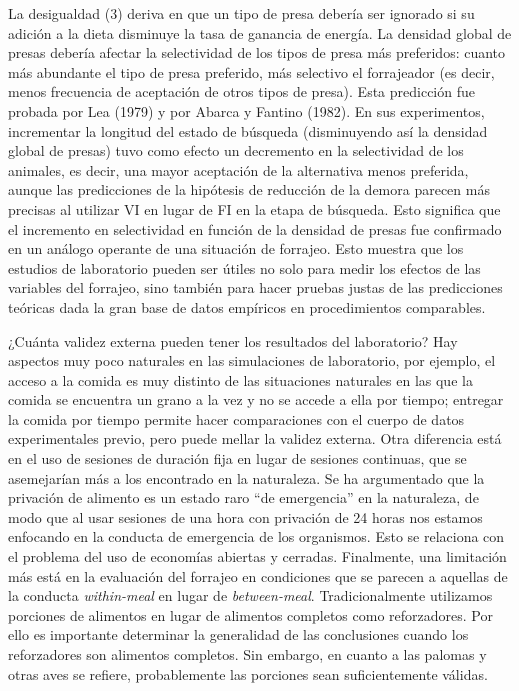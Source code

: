 \documentclass[a4paper,12pt]{article}
\begin{document}
La desigualdad (3) deriva en que un tipo de presa debería ser ignorado si su adición a la dieta disminuye la tasa de ganancia de energía. La densidad global de presas debería afectar la selectividad de los tipos de presa más preferidos: cuanto más abundante el tipo de presa preferido, más selectivo el forrajeador (es decir, menos frecuencia de aceptación de otros tipos de presa). Esta predicción fue probada por Lea (1979) y por Abarca y Fantino (1982). En sus experimentos, incrementar la longitud del estado de búsqueda (disminuyendo así la densidad global de presas) tuvo como efecto un decremento en la selectividad de los animales, es decir, una mayor aceptación de la alternativa menos preferida, aunque las predicciones de la hipótesis de reducción de la demora parecen más precisas al utilizar VI en lugar de FI en la etapa de búsqueda. Esto significa que el incremento en selectividad en función de la densidad de presas fue confirmado en un análogo operante de una situación de forrajeo. Esto muestra que los estudios de laboratorio pueden ser útiles no solo para medir los efectos de las variables del forrajeo, sino también para hacer pruebas justas de las predicciones teóricas dada la gran base de datos empíricos en procedimientos comparables.

¿Cuánta validez externa pueden tener los resultados del laboratorio? Hay aspectos muy poco naturales en las simulaciones de laboratorio, por ejemplo, el acceso a la comida es muy distinto de las situaciones naturales en las que la comida se encuentra un grano a la vez y no se accede a ella por tiempo; entregar la comida por tiempo permite hacer comparaciones con el cuerpo de datos experimentales previo, pero puede mellar la validez externa. Otra diferencia está en el uso de sesiones de duración fija en lugar de sesiones continuas, que se asemejarían más a los encontrado en la naturaleza. Se ha argumentado que la privación de alimento es un estado raro ``de emergencia'' en la naturaleza, de modo que al usar sesiones de una hora con privación de 24 horas nos estamos enfocando en la conducta de emergencia de los organismos. Esto se relaciona con el problema del uso de economías abiertas y cerradas. Finalmente, una limitación más está en la evaluación del forrajeo en condiciones que se parecen a aquellas de la conducta {\itshape within-meal} en lugar de {\itshape between-meal}. Tradicionalmente utilizamos porciones de alimentos en lugar de alimentos completos como reforzadores. Por ello es importante determinar la generalidad de las conclusiones cuando los reforzadores son alimentos completos. Sin embargo, en cuanto a las palomas y otras aves se refiere, probablemente las porciones sean suficientemente válidas.
\end{document}
